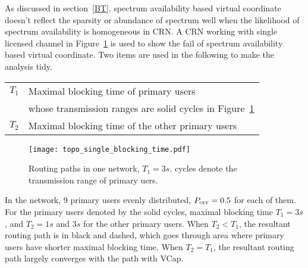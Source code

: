 
As discussed in section~\ref{BT}, spectrum availability based virtual coordinate doesn't reflect the sparsity or abundance of spectrum well when the likelihood of spectrum availability is homogeneous in CRN.
A CRN working with single licensed channel in Figure~\ref{fig:multipleChannelPioff_case_topo} is used to show the fail of spectrum availability based virtual coordinate.
Two items are used in the following to make the analysis tidy.
\begin{center}
\begin{tabular}{cl}
\toprule
 $T_1$        & Maximal blocking time of primary users  \\
				&  					whose transmission ranges are solid cycles in Figure~\ref{fig:multipleChannelPioff_case_topo}\\
\midrule  
    $T_2$       &  Maximal blocking time of the other primary users \\
\bottomrule
\end{tabular}
\end{center}
%
\begin{figure}[ht]
	\centering
    \texttt{[image: topo\_single\_blocking\_time.pdf]}
    \caption{Routing paths in one network, $T_1 = 3s$. cycles denote the transmission range of primary uers.} 			\label{fig:multipleChannelPioff_case_topo}
\end{figure}
In the network, 9 primary users evenly distributed, $P_{\textsc{\tiny OFF}}=0.5$ for each of them.
For the primary users denoted by the solid cycles, maximal blocking time $T_1 = 3s$, and $T_2 = 1s$ and $3s$ for the other primary users.
When $T_2 < T_1$, the resultant routing path is in black and dashed, which goes through area where primary users have shorter maximal blocking time.
When $T_2 = T_1$, the resultant routing path largely converges with the path with VCap.

